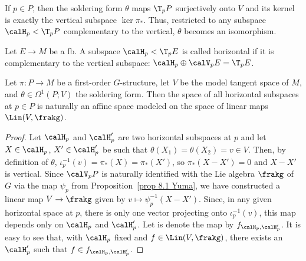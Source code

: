 If $p\in P$, then the soldering form $\theta$ maps $\T_p P$ surjectively onto $V$ and its kernel is exactly the vertical subspace $\ker\pi_{\ast}$. Thus, restricted to any subspace $\calH_p<\T_p P$ complementary to the vertical, $\theta$ becomes an isomorphism. 

\begin{defn}
    Let $E\to M$ be a \gls{fb}. A subspace $\calH_p<\T_p E$ is called horizontal if it is complementary to the vertical subspace: $\calH_p\oplus\calV_p E=\T_p E$.
\end{defn}

\begin{prop}
    Let $\pi:P\to M$ be a first-order $G$-structure, let $V$ be the model tangent space of $M$, and $\theta\in\Omega^1(P;V)$ the soldering form. Then the space of all horizontal subspaces at $p\in P$ is naturally an affine space modeled on the space of linear maps $\Lin(V,\frakg)$.
\end{prop}
\begin{proof}
    Let $\calH_p$ and $\calH_p'$ are two horizontal subspaces at $p$ and let $X\in \calH_p$, $X'\in\calH_p'$ be such that $\theta(X_1)=\theta(X_2)=v\in V$. Then, by definition of $\theta$, $\iota_p^{-1}(v)=\pi_\ast(X)=\pi_\ast(X')$, so $\pi_\ast(X-X')=0$ and $X-X'$ is vertical. Since $\calV_p P$ is naturally identified with the Lie algebra $\frakg$ of $G$ via the map $\psi_p$ from Proposition~\ref{prop 8.1 Yuma}, we have constructed a linear map $V\to \frakg$ given by $v\mapsto \psi_p^{-1}(X-X')$. Since, in any given horizontal space at $p$, there is only one vector projecting onto $\iota_p^{-1}(v)$, this map depends only on $\calH_p$ and $\calH_p'$. Let is denote the map by $f_{\calH_p,\calH_p'}$. It is easy to see that, with $\calH_p$ fixed and $f\in \Lin(V,\frakg)$, there exists an $\calH_p'$ such that $f\in f_{\calH_p,\calH_p'}$.
\end{proof}
 



